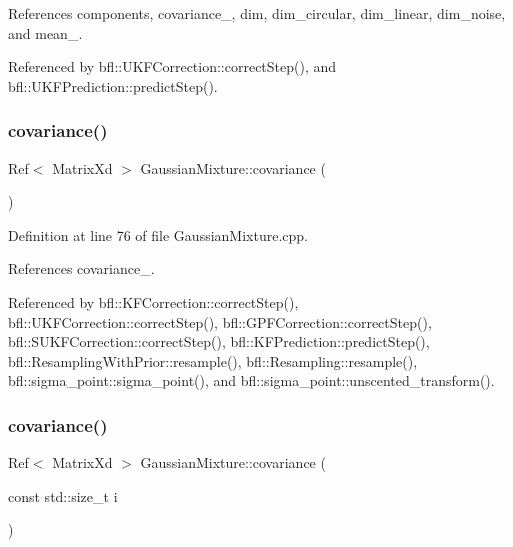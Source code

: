 References components, covariance\+\_\+, dim, dim\+\_\+circular, dim\+\_\+linear, dim\+\_\+noise, and mean\+\_\+.



Referenced by bfl\+::\+U\+K\+F\+Correction\+::correct\+Step(), and bfl\+::\+U\+K\+F\+Prediction\+::predict\+Step().

\mbox{\label{classbfl_1_1GaussianMixture_a65a60ef46d16ac33196a09963bbccdee}} 
\subsubsection{\texorpdfstring{covariance()}{covariance()}\hspace{0.1cm}{\footnotesize\ttfamily [1/6]}}
{\footnotesize\ttfamily Ref$<$ Matrix\+Xd $>$ Gaussian\+Mixture\+::covariance (\begin{DoxyParamCaption}{ }\end{DoxyParamCaption})}



Definition at line 76 of file Gaussian\+Mixture.\+cpp.



References covariance\+\_\+.



Referenced by bfl\+::\+K\+F\+Correction\+::correct\+Step(), bfl\+::\+U\+K\+F\+Correction\+::correct\+Step(), bfl\+::\+G\+P\+F\+Correction\+::correct\+Step(), bfl\+::\+S\+U\+K\+F\+Correction\+::correct\+Step(), bfl\+::\+K\+F\+Prediction\+::predict\+Step(), bfl\+::\+Resampling\+With\+Prior\+::resample(), bfl\+::\+Resampling\+::resample(), bfl\+::sigma\+\_\+point\+::sigma\+\_\+point(), and bfl\+::sigma\+\_\+point\+::unscented\+\_\+transform().

\mbox{\label{classbfl_1_1GaussianMixture_a80a6fa7d9edfc95103236378b4da3f7f}} 
\subsubsection{\texorpdfstring{covariance()}{covariance()}\hspace{0.1cm}{\footnotesize\ttfamily [2/6]}}
{\footnotesize\ttfamily Ref$<$ Matrix\+Xd $>$ Gaussian\+Mixture\+::covariance (\begin{DoxyParamCaption}\item[{const std\+::size\+\_\+t}]{i }\end{DoxyParamCaption})}



